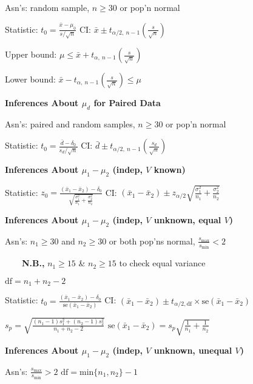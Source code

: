 \documentclass[twocolumn]{article}
\begin{document}
Asn's: random sample, $n \geq 30$ or pop'n normal

Statistic: $t_0 = \frac{\bar{x} - \mu_0}{s / \sqrt{n}}$ \hfill CI: $\bar{x} \pm t_{\alpha/2,\ n-1} \left( \frac{s}{\sqrt{n}} \right)$

Upper bound: $\mu \leq \bar{x} + t_{\alpha,\ n-1} \left( \frac{s}{\sqrt{n}} \right)$

Lower bound: $\bar{x} - t_{\alpha,\ n-1} \left( \frac{s}{\sqrt{n}} \right) \leq \mu$

\dotfill

\textbf{Inferences About $\mu_d$ for Paired Data}

Asn's: paired and random samples, $n \geq 30$ or pop'n normal

Statistic: $t_0 = \frac{\bar{d} - \delta_0}{s_d / \sqrt{n}}$ \hfill CI: $\bar{d} \pm t_{\alpha/2,\ n-1} \left( \frac{s_d}{\sqrt{n}} \right)$

\dotfill

\textbf{Inferences About $\mu_1 - \mu_2$ (indep, $V$ known)}

Statistic: $z_0 = \frac{(\bar{x}_1 - \bar{x}_2) - \delta_0}{\sqrt{ \frac{\sigma_1^2}{n_1} + \frac{\sigma_2^2}{n_2} }}$ \hfill CI: $(\bar{x}_1 - \bar{x}_2) \pm z_{\alpha/2} \sqrt{ \frac{\sigma_1^2}{n_1} + \frac{\sigma_2^2}{n_2} }$

\dotfill

\textbf{Inferences About $\mu_1 - \mu_2$ (indep, $V$ unknown, equal $V$)}

Asn's: $n_1 \geq 30$ and $n_2 \geq 30$ or both pop'ns normal, $\frac{s_{\text{max}}}{s_{\text{min}}} < 2$

$\quad\quad$\textbf{N.B.,} $n_1 \geq 15$ \& $n_2 \geq 15$ to check equal variance

$\text{df} = n_1 + n_2 - 2$

Statistic: $t_0 = \frac{(\bar{x}_1 - \bar{x}_2) - \delta_0}{\text{se}(\bar{x}_1 - \bar{x}_2)}$ \hfill CI: $(\bar{x}_1 - \bar{x}_2) \pm t_{\alpha/2, \text{df}} \times \text{se}(\bar{x}_1 - \bar{x}_2)$

$s_p = \sqrt{ \frac{(n_1 - 1)s_1^2 + (n_2 - 1)s_2^2}{n_1 + n_2 -2} }$ \hfill $\text{se}(\bar{x}_1 - \bar{x}_2) = s_p \sqrt{\frac{1}{n_1} + \frac{1}{n_2}}$

\dotfill

\textbf{Inferences About $\mu_1 - \mu_2$ (indep, $V$ unknown, unequal $V$)}

Asn's: $\frac{s_{\text{max}}}{s_{\text{min}}} > 2$ \hfill $\text{df} = \text{min} \{ n_1, n_2 \} - 1$
\end{document}
